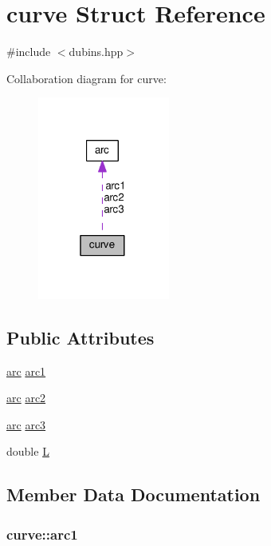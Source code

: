 \hypertarget{structcurve}{}\section{curve Struct Reference}
\label{structcurve}


{\ttfamily \#include $<$dubins.\+hpp$>$}



Collaboration diagram for curve\+:
\nopagebreak
\begin{figure}[H]
\begin{center}
\leavevmode
\includegraphics[width=123pt]{structcurve__coll__graph}
\end{center}
\end{figure}
\subsection*{Public Attributes}
\begin{DoxyCompactItemize}
\item 
\hyperlink{structarc}{arc} \hyperlink{structcurve_a561c4b09698c4345b43612be6cfec998}{arc1}
\item 
\hyperlink{structarc}{arc} \hyperlink{structcurve_a083ce33b9edd1a56fe43b876d04f7364}{arc2}
\item 
\hyperlink{structarc}{arc} \hyperlink{structcurve_aba4fe40ec5f59f6486fece0130ee6e0d}{arc3}
\item 
double \hyperlink{structcurve_a27eddb6f3444830629650419b4abb840}{L}
\end{DoxyCompactItemize}


\subsection{Member Data Documentation}
\subsubsection[{\texorpdfstring{arc1}{arc1}}]{ curve\+::arc1}\hypertarget{structcurve_a561c4b09698c4345b43612be6cfec998}{}\label{structcurve_a561c4b09698c4345b43612be6cfec998}
